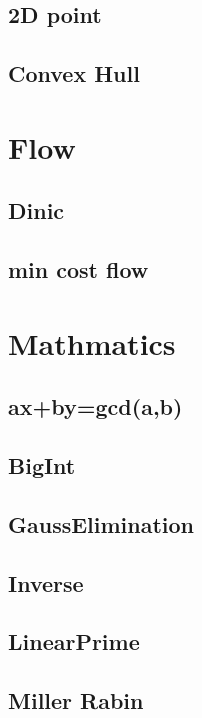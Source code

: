 \subsection{2D point}

\subsection{Convex Hull}


\section{Flow}

\subsection{Dinic}

\subsection{min cost flow}


\section{Mathmatics}

\subsection{ax+by=gcd(a,b)}

\subsection{BigInt}

\subsection{GaussElimination}

\subsection{Inverse}

\subsection{LinearPrime}

\subsection{Miller Rabin}

